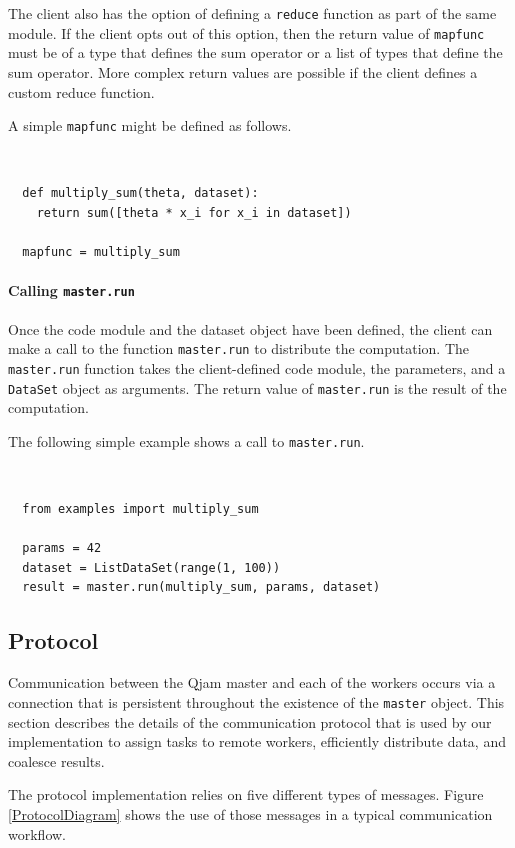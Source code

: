 \documentclass[%
  final,
  notitlepage,
  narroweqnarray,
  inline,
]{ieee}
\begin{document}
The client also has the option of defining a \texttt{reduce} function as part
of the same module. If the client opts out of this option, then the return
value of \texttt{mapfunc} must be of a type that defines the sum operator or
a list of types that define the sum operator. More complex return values are
possible if the client defines a custom reduce function.

A simple \texttt{mapfunc} might be defined as follows.

{\tt \small
\begin{verbatim}
  def multiply_sum(theta, dataset):
    return sum([theta * x_i for x_i in dataset])

  mapfunc = multiply_sum
\end{verbatim}}


\paragraph{Calling \texttt{master.run}}

Once the code module and the dataset object have been defined, the client can
make a call to the function \texttt{master.run} to distribute the
computation. The \texttt{master.run} function takes the client-defined code
module, the parameters, and a \texttt{DataSet} object as arguments. The return
value of \texttt{master.run} is the result of the computation.

The following simple example shows a call to \texttt{master.run}.

{\tt \small
\begin{verbatim}
  from examples import multiply_sum

  params = 42
  dataset = ListDataSet(range(1, 100))
  result = master.run(multiply_sum, params, dataset)
\end{verbatim}}


\subsection{Protocol}
\label{Protocol}

Communication between the Qjam master and each of the workers occurs via
a connection that is persistent throughout the existence of the \texttt{master}
object. This section describes the details of the communication protocol that
is used by our implementation to assign tasks to remote workers, efficiently
distribute data, and coalesce results.

The protocol implementation relies on five different types of messages. Figure
\ref{ProtocolDiagram} shows the use of those messages in a typical
communication workflow.
\end{document}
